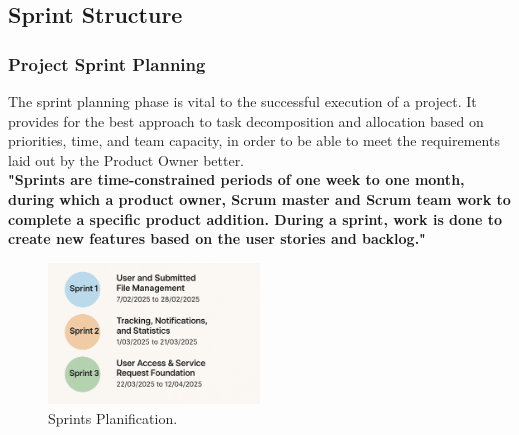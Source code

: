 \subsection{Sprint Structure}
\subsubsection{Project Sprint Planning}
The sprint planning phase is vital to the successful execution of a project. It provides for the best approach to task decomposition and allocation based on priorities, time, and team capacity, in order to be able to meet the requirements laid out by the Product Owner better.\\
\textbf{"Sprints are time-constrained periods of one week to one month, during which a product owner, Scrum master and Scrum team work to complete a specific product addition. During a sprint, work is done to create new features based on the user stories and backlog."}\cite{samplewebs5}
\begin{figure}[h]
    \centering
    \includegraphics[width=0.5\textwidth]{figures/sprints.png}  
    \caption{Sprints Planification.}
\end{figure} \
